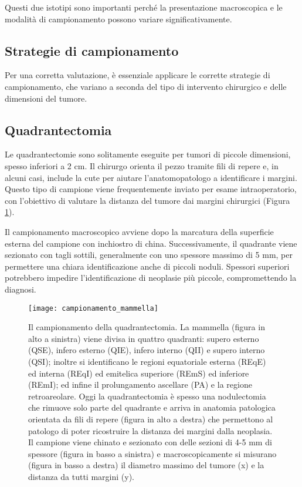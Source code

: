 Questi due istotipi sono importanti perché la presentazione macroscopica e le modalità di campionamento possono variare significativamente.

\subsection{Strategie di campionamento}
Per una corretta valutazione, è essenziale applicare le corrette strategie di campionamento, che variano a seconda del tipo di intervento chirurgico e delle dimensioni del tumore.

\subsection{Quadrantectomia}
Le quadrantectomie sono solitamente eseguite per tumori di piccole dimensioni, spesso inferiori a 2 cm. Il chirurgo orienta il pezzo tramite fili di repere e, in alcuni casi, include la cute per aiutare l'anatomopatologo a identificare i margini. Questo tipo di campione viene frequentemente inviato per esame intraoperatorio, con l’obiettivo di valutare la distanza del tumore dai margini chirurgici (Figura \ref{fig:campionamento_mammella}).

Il campionamento macroscopico avviene dopo la marcatura della superficie esterna del campione con inchiostro di china. Successivamente, il quadrante viene sezionato con tagli sottili, generalmente con uno spessore massimo di 5 mm, per permettere una chiara identificazione anche di piccoli noduli. Spessori superiori potrebbero impedire l’identificazione di neoplasie più piccole, compromettendo la diagnosi.


\begin{figure}[p]
    \centering
    \texttt{[image: campionamento\_mammella]}
    \caption{Il campionamento della quadrantectomia.  La mammella (figura in alto a sinistra) viene divisa in quattro quadranti: supero esterno (QSE), infero esterno (QIE), infero interno (QII) e supero interno (QSI); inoltre si identificano le regioni equatoriale esterna (REqE) ed interna (REqI) ed emitelica superiore (REmS) ed inferiore (REmI); ed infine il prolungamento ascellare (PA) e la regione retroareolare. Oggi la quadrantectomia è spesso una nodulectomia che rimuove solo parte del quadrante e arriva in anatomia patologica orientata da fili di repere (figura in alto a destra) che permettono al patologo di poter ricostruire la distanza dei margini dalla neoplasia. Il campione viene chinato e sezionato con delle sezioni di 4-5 mm di spessore (figura in basso a sinistra) e macroscopicamente si misurano (figura in basso a destra) il diametro massimo del tumore (x) e la distanza da tutti margini (y).}
    \label{fig:campionamento_mammella}
\end{figure}

